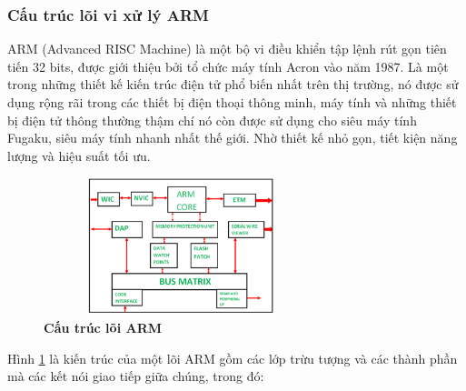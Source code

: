 \documentclass{article} %
\begin{document}
	\subsubsection{Cấu trúc lõi vi xử lý ARM}
	
	ARM (Advanced RISC Machine) là một bộ vi điều khiển tập lệnh rút gọn tiên tiến 32 bits, được giới thiệu bởi tổ chức máy tính Acron vào năm 1987. Là một trong những thiết kế kiến trúc điện tử phổ biến nhất trên thị trường, nó được sử dụng rộng rãi trong các thiết bị điện thoại thông minh, máy tính và những thiết bị điện tử thông thường thậm chí nó còn được sử dụng cho siêu máy tính Fugaku, siêu máy tính nhanh nhất thế giới. Nhờ thiết kế nhỏ gọn, tiết kiện năng lượng và hiệu suất tối ưu.
	
	\begin{figure}[!ht]
		\centering
		\includegraphics[width=8cm,height=4cm]{Images/ARMORIGIN.png}
		\caption[Cấu trúc lõi ARM \cite{ARM}]{\bfseries \fontsize{12pt}{0pt}\selectfont Cấu trúc lõi ARM\cite{ARM}}
		\label{ARM_ORIGIN}
	\end{figure}
	
	Hình \ref{ARM_ORIGIN} là kiến trúc của một lõi ARM gồm các lớp trừu tượng và các thành phần mà các kết nói giao tiếp giữa chúng, trong đó:
	
\end{document}

